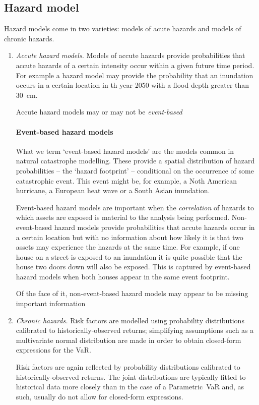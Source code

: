 \documentclass[a4paper,11pt]{extarticle} %
\begin{document}
\subsection{Hazard model}
Hazard models come in two varieties: models of acute hazards and models of chronic hazards.
\begin{enumerate}[label=\Alph*.]
\item{\emph{Accute hazard models.}}
Models of accute hazards provide probabilities that accute hazards of a certain intensity occur within a given future time period. For example a hazard model may provide the probability that an inundation occurs in a certain location in th year 2050 with a flood depth greater than 30~cm. 

Accute hazard models may or may not be \emph{event-based}
\paragraph{Event-based hazard models}
What we term `event-based hazard models' are the models common in natural catastrophe modelling. These provide a spatial distribution of hazard probabilities -- the `hazard footprint' -- conditional on the occurrence of some catastrophic event. This event might be, for example, a Noth American hurricane, a European heat wave or a South Asian inundation. 

Event-based hazard models are important when the \emph{correlation} of hazards to which assets are exposed is material to the analysis being performed. Non-event-based hazard models provide probabilities that accute hazards occur in a certain location but with no information about how likely it is that two assets may experience the hazards at the same time. For example, if one house on a street is exposed to an inundation it is quite possible that the house two doors down will also be exposed. This is captured by event-based hazard models when both houses appear in the same event footprint.

Of the face of it, non-event-based hazard models may appear to be missing important information  



\item{\emph{Chronic hazards.}}
Risk factors are modelled using probability distributions calibrated to historically-observed returns; simplifying assumptions such as a multivariate normal distribution are made in order to obtain closed-form expressions for the VaR.

Risk factors are again reflected by probability distributions calibrated to historically-observed returns. The joint distributions are typically fitted to historical data more closely than in the case of a Parametric~VaR and, as such, usually do not allow for closed-form expressions.

\end{enumerate}
\end{document}
